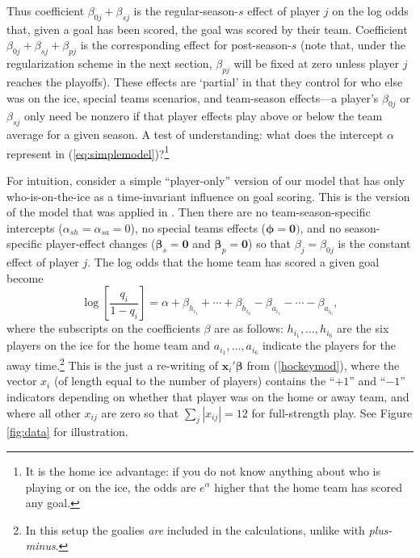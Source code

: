 Thus coefficient
$\beta_{0j} + \beta_{sj}$ is the regular-season-$s$ effect of player $j$ on the log
odds that, given a goal has been scored, the goal was scored by their team.  Coefficient 
$\beta_{0j} + \beta_{sj} + \beta_{pj}$ is the corresponding effect for post-season-$s$ (note that, under the regularization scheme in the next section, $\beta_{pj}$ will be fixed at zero unless player $j$ reaches the playoffs). 
These effects are `partial' in that they control for who else was on the ice,
special teams scenarios, and team-season effects---a player's
$\beta_{0j}$ or $\beta_{sj}$ only need be nonzero if that player effects play
above or below the team average for a given season.  A test of
understanding: what does the intercept $\alpha$ represent in
(\ref{eq:simplemodel})?\footnote{It is the home ice advantage: if you do not
know anything about who is playing or on the ice, the odds are $e^{\alpha}$
higher that the home team has scored any goal.}


For intuition, consider a simple ``player-only'' version of our model that has
only who-is-on-the-ice as a time-invariant influence on goal scoring.  This is the version of the model that was applied in \cite{gramacy:jensen:taddy:2013}.  Then
there are no team-season-specific intercepts ($\alpha_{sh}=\alpha_{sa}=0$), no
special teams effects ($\boldsymbol{\phi}=\mathbf{0})$, and no season-specific
player-effect changes ($\boldsymbol{\beta}_s = \mathbf{0}$ and $\boldsymbol{\beta}_p = \mathbf{0}$)  so that $\beta_j
= \beta_{0j}$ is the constant effect of player $j$.  The log odds that the
home team has scored a given goal become \begin{equation} \log
\left[\frac{q_i}{1-q_i} \right]  = \alpha + \beta_{h_{i_1}} + \cdots +
\beta_{h_{i_6}} -  \beta_{a_{i_1}} - \cdots - \beta_{a_{i_6}},
\label{eq:simplemodel} \end{equation} where the subscripts on the coefficients
$\beta$ are as follows: $h_{i_1}, \dots, h_{i_6}$ are the six players on the
ice for the home team and  $a_{i_1}, \dots, a_{i_6}$ indicate the players for
the away time.\footnote{In this setup the goalies {\em are} included in the
calculations, unlike with {\em plus-minus}.}  This is the just a re-writing of
$\mathbf{x}_i'\boldsymbol{\beta}$ from (\ref{hockeymod}), where the vector
$x_i$ (of length equal to the number of players) contains the ``$+1$'' and
``$-1$'' indicators depending on whether that player was on the home or away
team, and where all other $x_{ij}$ are zero so that $\sum_j |x_{ij}| = 12$ for
full-strength play. See Figure \ref{fig:data} for illustration. 


